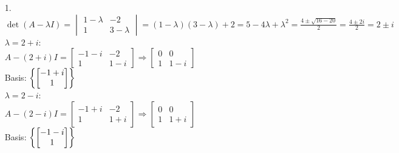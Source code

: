 \documentclass[leqno]{article}
\begin{document}
\begin{enumerate}
    \item[1.]
    $\displaystyle \det(A - \lambda I) = \begin{vmatrix}1 - \lambda & -2 \\ 1 & 3 - \lambda\end{vmatrix} = (1 - \lambda)(3 - \lambda) + 2 = 5 - 4\lambda + \lambda^2 = \frac{4 \pm \sqrt{16 - 20}}{2} = \frac{4 \pm 2i}{2} = 2 \pm i$\\
    $\lambda = 2 + i$:\\
    $A - (2 + i)I = \begin{bmatrix}-1 - i & -2 \\ 1 & 1 - i\end{bmatrix} \Rightarrow \begin{bmatrix}0 & 0 \\ 1 & 1 - i\end{bmatrix}$\\
    Basis: $\left\{\begin{bmatrix}-1 + i \\ 1\end{bmatrix}\right\}$\\
    $\lambda = 2 - i$:\\
    $A - (2 - i)I = \begin{bmatrix}-1 + i & -2 \\ 1 & 1 + i\end{bmatrix} \Rightarrow \begin{bmatrix}0 & 0 \\ 1 & 1 + i\end{bmatrix}$\\
    Basis: $\left\{\begin{bmatrix}-1 - i \\ 1\end{bmatrix}\right\}$


\end{enumerate}
\end{document}
